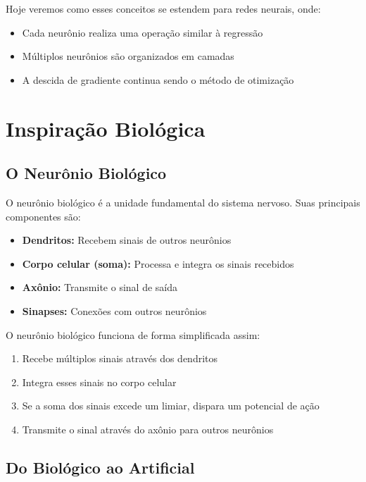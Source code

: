 \documentclass[a4paper,12pt]{article}
\begin{document}
Hoje veremos como esses conceitos se estendem para redes neurais, onde:
\begin{itemize}
    \item Cada neurônio realiza uma operação similar à regressão
    \item Múltiplos neurônios são organizados em camadas
    \item A descida de gradiente continua sendo o método de otimização
\end{itemize}

\section{Inspiração Biológica}

\subsection{O Neurônio Biológico}

O neurônio biológico é a unidade fundamental do sistema nervoso. Suas principais componentes são:

\begin{itemize}
    \item \textbf{Dendritos:} Recebem sinais de outros neurônios
    \item \textbf{Corpo celular (soma):} Processa e integra os sinais recebidos
    \item \textbf{Axônio:} Transmite o sinal de saída
    \item \textbf{Sinapses:} Conexões com outros neurônios
\end{itemize}

O neurônio biológico funciona de forma simplificada assim:
\begin{enumerate}
    \item Recebe múltiplos sinais através dos dendritos
    \item Integra esses sinais no corpo celular
    \item Se a soma dos sinais excede um limiar, dispara um potencial de ação
    \item Transmite o sinal através do axônio para outros neurônios
\end{enumerate}

\subsection{Do Biológico ao Artificial}
\end{document}
